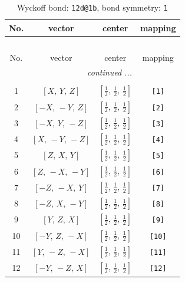 \documentclass[fleqn,8pt]{jsarticle}
\begin{document}
\begin{longtable}{cccc}
\caption{Wyckoff bond: {\tt 12d@1b}, bond symmetry: {\tt 1}}
 \\
 \hline \hline
No. & vector & center & mapping \\ \hline \endfirsthead

\multicolumn{3}{l}{\tablename\ \thetable{}} \\
 \hline \hline
No. & vector & center & mapping \\ \hline \endhead

 \hline \hline
\multicolumn{3}{r}{\footnotesize\it continued ...} \\ \endfoot

 \hline \hline
\multicolumn{3}{r}{} \\ \endlastfoot

1 & $\left[ X,\, Y,\, Z \right]$ & $\left[ \frac{1}{2},\, \frac{1}{2},\, \frac{1}{2} \right]$ & {\tt [1]} \\ \hline
2 & $\left[ - X,\, - Y,\, Z \right]$ & $\left[ \frac{1}{2},\, \frac{1}{2},\, \frac{1}{2} \right]$ & {\tt [2]} \\ \hline
3 & $\left[ - X,\, Y,\, - Z \right]$ & $\left[ \frac{1}{2},\, \frac{1}{2},\, \frac{1}{2} \right]$ & {\tt [3]} \\ \hline
4 & $\left[ X,\, - Y,\, - Z \right]$ & $\left[ \frac{1}{2},\, \frac{1}{2},\, \frac{1}{2} \right]$ & {\tt [4]} \\ \hline
5 & $\left[ Z,\, X,\, Y \right]$ & $\left[ \frac{1}{2},\, \frac{1}{2},\, \frac{1}{2} \right]$ & {\tt [5]} \\ \hline
6 & $\left[ Z,\, - X,\, - Y \right]$ & $\left[ \frac{1}{2},\, \frac{1}{2},\, \frac{1}{2} \right]$ & {\tt [6]} \\ \hline
7 & $\left[ - Z,\, - X,\, Y \right]$ & $\left[ \frac{1}{2},\, \frac{1}{2},\, \frac{1}{2} \right]$ & {\tt [7]} \\ \hline
8 & $\left[ - Z,\, X,\, - Y \right]$ & $\left[ \frac{1}{2},\, \frac{1}{2},\, \frac{1}{2} \right]$ & {\tt [8]} \\ \hline
9 & $\left[ Y,\, Z,\, X \right]$ & $\left[ \frac{1}{2},\, \frac{1}{2},\, \frac{1}{2} \right]$ & {\tt [9]} \\ \hline
10 & $\left[ - Y,\, Z,\, - X \right]$ & $\left[ \frac{1}{2},\, \frac{1}{2},\, \frac{1}{2} \right]$ & {\tt [10]} \\ \hline
11 & $\left[ Y,\, - Z,\, - X \right]$ & $\left[ \frac{1}{2},\, \frac{1}{2},\, \frac{1}{2} \right]$ & {\tt [11]} \\ \hline
12 & $\left[ - Y,\, - Z,\, X \right]$ & $\left[ \frac{1}{2},\, \frac{1}{2},\, \frac{1}{2} \right]$ & {\tt [12]} \\
\end{longtable}
\end{document}
